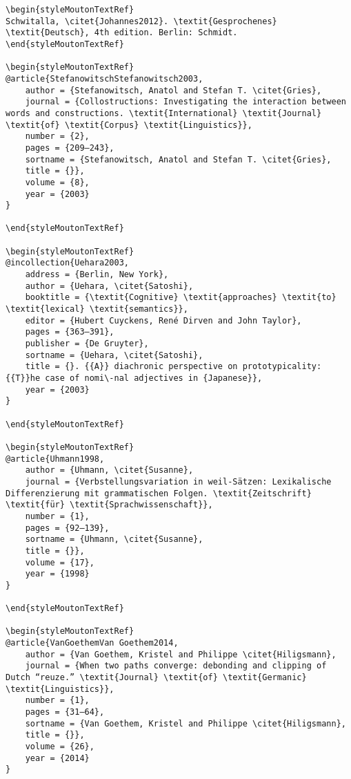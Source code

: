\begin{styleMoutonHeadingRef}
\begin{verbatim}
\begin{styleMoutonTextRef}
Schwitalla, \citet{Johannes2012}. \textit{Gesprochenes} \textit{Deutsch}, 4th edition. Berlin: Schmidt.
\end{styleMoutonTextRef}

\begin{styleMoutonTextRef}
@article{StefanowitschStefanowitsch2003,
	author = {Stefanowitsch, Anatol and Stefan T. \citet{Gries},
	journal = {Collostructions: Investigating the interaction between words and constructions. \textit{International} \textit{Journal} \textit{of} \textit{Corpus} \textit{Linguistics}},
	number = {2},
	pages = {209–243},
	sortname = {Stefanowitsch, Anatol and Stefan T. \citet{Gries},
	title = {}},
	volume = {8},
	year = {2003}
}

\end{styleMoutonTextRef}

\begin{styleMoutonTextRef}
@incollection{Uehara2003,
	address = {Berlin, New York},
	author = {Uehara, \citet{Satoshi},
	booktitle = {\textit{Cognitive} \textit{approaches} \textit{to} \textit{lexical} \textit{semantics}},
	editor = {Hubert Cuyckens, René Dirven and John Taylor},
	pages = {363–391},
	publisher = {De Gruyter},
	sortname = {Uehara, \citet{Satoshi},
	title = {}. {{A}} diachronic perspective on prototypicality: {{T}}he case of nomi\-nal adjectives in {Japanese}},
	year = {2003}
}

\end{styleMoutonTextRef}

\begin{styleMoutonTextRef}
@article{Uhmann1998,
	author = {Uhmann, \citet{Susanne},
	journal = {Verbstellungsvariation in weil-Sätzen: Lexikalische Differenzierung mit grammatischen Folgen. \textit{Zeitschrift} \textit{für} \textit{Sprachwissenschaft}},
	number = {1},
	pages = {92–139},
	sortname = {Uhmann, \citet{Susanne},
	title = {}},
	volume = {17},
	year = {1998}
}

\end{styleMoutonTextRef}

\begin{styleMoutonTextRef}
@article{VanGoethemVan Goethem2014,
	author = {Van Goethem, Kristel and Philippe \citet{Hiligsmann},
	journal = {When two paths converge: debonding and clipping of Dutch “reuze.” \textit{Journal} \textit{of} \textit{Germanic} \textit{Linguistics}},
	number = {1},
	pages = {31–64},
	sortname = {Van Goethem, Kristel and Philippe \citet{Hiligsmann},
	title = {}},
	volume = {26},
	year = {2014}
}


\end{verbatim}
\end{styleMoutonHeadingRef}
